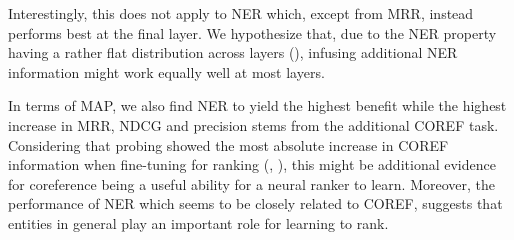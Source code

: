 Interestingly, this does not apply to NER which, except from MRR, instead performs best at the final layer. We hypothesize that, due to the NER property having a rather flat distribution across layers (), infusing additional NER information might work equally well at most layers.

In terms of MAP, we also find NER to yield the highest benefit while the highest increase in MRR, NDCG and precision stems from the additional COREF task. Considering that probing showed the most absolute increase in COREF information when fine-tuning for ranking (, ), this might be additional evidence for coreference being a useful ability for a neural ranker to learn. Moreover, the performance of NER which seems to be closely related to COREF, suggests that entities in general play an important role for learning to rank.

